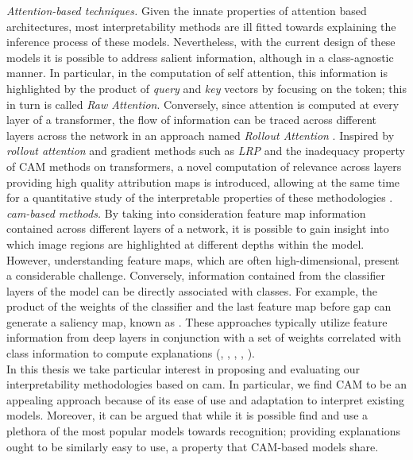 \noindent \emph{Attention-based techniques.} Given the innate properties of attention based 
architectures, most interpretability methods are ill fitted towards explaining the inference 
process of these models. Nevertheless, with the current design of these models it is possible to 
address salient information, although in a class-agnostic manner. In particular, in the computation 
of self attention, this information is highlighted by the product of \emph{query} and \emph{key} 
vectors by focusing on the \Th{[CLS]} token; this in turn is called \emph{Raw Attention}. 
Conversely, since attention is computed at every layer of a transformer, the flow of information 
can be traced across different layers across the network in an approach named \emph{Rollout 
Attention} \autocite{abnar2020quantifying}. Inspired by \emph{rollout attention} and gradient 
methods such as \emph{LRP} \autocite{bach2015pixel} and the inadequacy property of CAM methods on 
transformers, a novel computation of relevance across layers providing high quality attribution 
maps is introduced, allowing at the same time for a quantitative study of the interpretable 
properties of these methodologies \autocite{chefer2021transformer}.\\

\noindent \emph{\gls{cam}-based methods.} By taking into consideration feature map information 
contained across different layers of a network, it is possible to gain insight into which image 
regions are highlighted at different depths within the model. However, understanding feature maps, 
which are often high-dimensional, present a considerable challenge. Conversely, information 
contained from the classifier layers of the model can be directly associated with classes. For 
example, the product of the weights of the classifier and the last feature map before \gls{gap} 
can generate a saliency map, known as  \autocite{zhou2016learning}. These approaches 
typically utilize feature information from deep layers in conjunction with a set of weights 
correlated with class information to compute explanations (\cite{selvaraju2017grad}, 
\cite{chattopadhay2018grad}, \cite{wang2020score}, \cite{axiombased}, \cite{ablationcam}
\cite{jiang2021layercam}).\\

In this thesis we take particular interest in proposing and evaluating our interpretability 
methodologies based on \gls{cam}. In particular, we find CAM to be an appealing approach because of 
its ease of use and adaptation to interpret existing models. Moreover, it can be argued that while 
it is possible find and use a plethora of the most popular models towards recognition; providing 
explanations ought to be similarly easy to use, a property that CAM-based models share.\\

